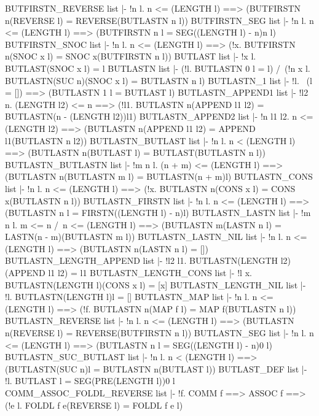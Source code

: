 \THEOREM BUTFIRSTN\_REVERSE list
|- !n l.
    n <= (LENGTH l) ==> (BUTFIRSTN n(REVERSE l) = REVERSE(BUTLASTN n l))
\ENDTHEOREM
\THEOREM BUTFIRSTN\_SEG list
|- !n l. n <= (LENGTH l) ==> (BUTFIRSTN n l = SEG((LENGTH l) - n)n l)
\ENDTHEOREM
\THEOREM BUTFIRSTN\_SNOC list
|- !n l.
    n <= (LENGTH l) ==>
    (!x. BUTFIRSTN n(SNOC x l) = SNOC x(BUTFIRSTN n l))
\ENDTHEOREM
\THEOREM BUTLAST list
|- !x l. BUTLAST(SNOC x l) = l
\ENDTHEOREM
\THEOREM BUTLASTN list
|- (!l. BUTLASTN 0 l = l) /\
   (!n x l. BUTLASTN(SUC n)(SNOC x l) = BUTLASTN n l)
\ENDTHEOREM
\THEOREM BUTLASTN\_1 list
|- !l. ~(l = []) ==> (BUTLASTN 1 l = BUTLAST l)
\ENDTHEOREM
\THEOREM BUTLASTN\_APPEND1 list
|- !l2 n.
    (LENGTH l2) <= n ==>
    (!l1. BUTLASTN n(APPEND l1 l2) = BUTLASTN(n - (LENGTH l2))l1)
\ENDTHEOREM
\THEOREM BUTLASTN\_APPEND2 list
|- !n l1 l2.
    n <= (LENGTH l2) ==>
    (BUTLASTN n(APPEND l1 l2) = APPEND l1(BUTLASTN n l2))
\ENDTHEOREM
\THEOREM BUTLASTN\_BUTLAST list
|- !n l.
    n < (LENGTH l) ==> (BUTLASTN n(BUTLAST l) = BUTLAST(BUTLASTN n l))
\ENDTHEOREM
\THEOREM BUTLASTN\_BUTLASTN list
|- !m n l.
    (n + m) <= (LENGTH l) ==>
    (BUTLASTN n(BUTLASTN m l) = BUTLASTN(n + m)l)
\ENDTHEOREM
\THEOREM BUTLASTN\_CONS list
|- !n l.
    n <= (LENGTH l) ==>
    (!x. BUTLASTN n(CONS x l) = CONS x(BUTLASTN n l))
\ENDTHEOREM
\THEOREM BUTLASTN\_FIRSTN list
|- !n l. n <= (LENGTH l) ==> (BUTLASTN n l = FIRSTN((LENGTH l) - n)l)
\ENDTHEOREM
\THEOREM BUTLASTN\_LASTN list
|- !m n l.
    m <= n /\ n <= (LENGTH l) ==>
    (BUTLASTN m(LASTN n l) = LASTN(n - m)(BUTLASTN m l))
\ENDTHEOREM
\THEOREM BUTLASTN\_LASTN\_NIL list
|- !n l. n <= (LENGTH l) ==> (BUTLASTN n(LASTN n l) = [])
\ENDTHEOREM
\THEOREM BUTLASTN\_LENGTH\_APPEND list
|- !l2 l1. BUTLASTN(LENGTH l2)(APPEND l1 l2) = l1
\ENDTHEOREM
\THEOREM BUTLASTN\_LENGTH\_CONS list
|- !l x. BUTLASTN(LENGTH l)(CONS x l) = [x]
\ENDTHEOREM
\THEOREM BUTLASTN\_LENGTH\_NIL list
|- !l. BUTLASTN(LENGTH l)l = []
\ENDTHEOREM
\THEOREM BUTLASTN\_MAP list
|- !n l.
    n <= (LENGTH l) ==> (!f. BUTLASTN n(MAP f l) = MAP f(BUTLASTN n l))
\ENDTHEOREM
\THEOREM BUTLASTN\_REVERSE list
|- !n l.
    n <= (LENGTH l) ==> (BUTLASTN n(REVERSE l) = REVERSE(BUTFIRSTN n l))
\ENDTHEOREM
\THEOREM BUTLASTN\_SEG list
|- !n l. n <= (LENGTH l) ==> (BUTLASTN n l = SEG((LENGTH l) - n)0 l)
\ENDTHEOREM
\THEOREM BUTLASTN\_SUC\_BUTLAST list
|- !n l. n < (LENGTH l) ==> (BUTLASTN(SUC n)l = BUTLASTN n(BUTLAST l))
\ENDTHEOREM
\THEOREM BUTLAST\_DEF list
|- !l. BUTLAST l = SEG(PRE(LENGTH l))0 l
\ENDTHEOREM
\THEOREM COMM\_ASSOC\_FOLDL\_REVERSE list
|- !f. COMM f ==> ASSOC f ==> (!e l. FOLDL f e(REVERSE l) = FOLDL f e l)
